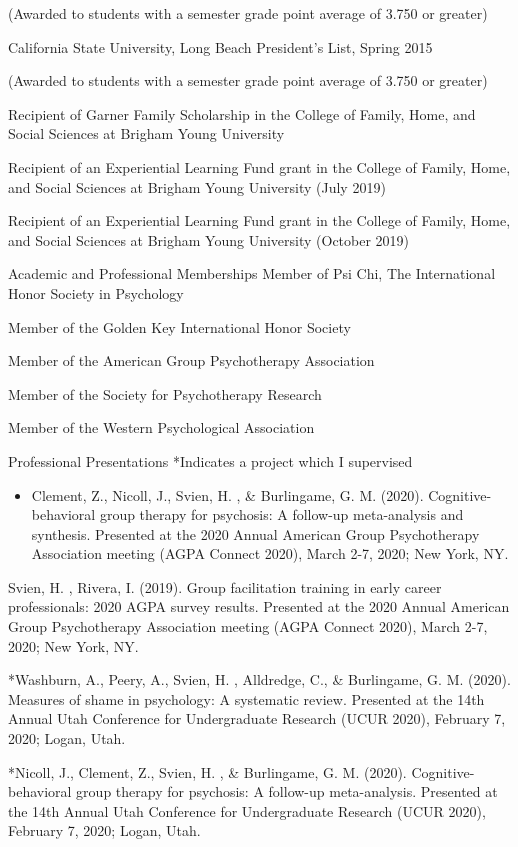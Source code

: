 \documentclass[
]{article}
\providecommand{\tightlist}{%
  \setlength{\itemsep}{0pt}\setlength{\parskip}{0pt}}
\begin{document}
(Awarded to students with a semester grade point average of 3.750 or greater)

California State University, Long Beach President's List, Spring 2015

(Awarded to students with a semester grade point average of 3.750 or greater)

Recipient of Garner Family Scholarship in the College of Family, Home, and Social Sciences at Brigham Young University

Recipient of an Experiential Learning Fund grant in the College of Family, Home, and Social Sciences at Brigham Young University (July 2019)

Recipient of an Experiential Learning Fund grant in the College of Family, Home, and Social Sciences at Brigham Young University (October 2019)

Academic and Professional Memberships
Member of Psi Chi, The International Honor Society in Psychology

Member of the Golden Key International Honor Society

Member of the American Group Psychotherapy Association

Member of the Society for Psychotherapy Research

Member of the Western Psychological Association

Professional Presentations
*Indicates a project which I supervised

\begin{itemize}
\tightlist
\item
  Clement, Z., Nicoll, J., Svien, H. , \& Burlingame, G. M. (2020). Cognitive-behavioral group therapy for psychosis: A follow-up meta-analysis and synthesis. Presented at the 2020 Annual American Group Psychotherapy Association meeting (AGPA Connect 2020), March 2-7, 2020; New York, NY.
\end{itemize}

Svien, H. , Rivera, I. (2019). Group facilitation training in early career professionals: 2020 AGPA survey results. Presented at the 2020 Annual American Group Psychotherapy Association meeting (AGPA Connect 2020), March 2-7, 2020; New York, NY.

*Washburn, A., Peery, A., Svien, H. , Alldredge, C., \& Burlingame, G. M. (2020). Measures of shame in psychology: A systematic review. Presented at the 14th Annual Utah Conference for Undergraduate Research (UCUR 2020), February 7, 2020; Logan, Utah.

*Nicoll, J., Clement, Z., Svien, H. , \& Burlingame, G. M. (2020). Cognitive-behavioral group therapy for psychosis: A follow-up meta-analysis. Presented at the 14th Annual Utah Conference for Undergraduate Research (UCUR 2020), February 7, 2020; Logan, Utah.
\end{document}
